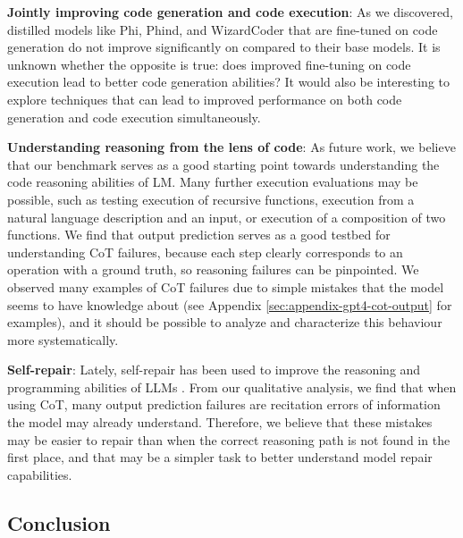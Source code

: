 \textbf{Jointly improving code generation and code execution}: As we discovered, distilled models like Phi, Phind, and WizardCoder that are fine-tuned on code generation do not improve significantly on \benchmark compared to their base models. It is unknown whether the opposite is true: does improved fine-tuning on code execution lead to better code generation abilities? It would also be interesting to explore techniques that can lead to improved performance on both code generation and code execution simultaneously.

\textbf{Understanding reasoning from the lens of code}: As future work, we believe that our benchmark serves as a good starting point towards understanding the code reasoning abilities of LM. Many further execution evaluations may be possible, such as testing execution of recursive functions, execution from a natural language description and an input, or execution of a composition of two functions. We find that output prediction serves as a good testbed for understanding CoT failures, because each step clearly corresponds to an operation with a ground truth, so reasoning failures can be pinpointed. We observed many examples of CoT failures due to simple mistakes that the model seems to have knowledge about (see Appendix \ref{sec:appendix-gpt4-cot-output} for examples), and it should be possible to analyze and characterize this behaviour more systematically. 

\textbf{Self-repair}: Lately, self-repair has been used to improve the reasoning and programming abilities of LLMs \citep{chen2023teaching, olausson2023demystifying, madaan2023self, peng2023check, zhang2023self, tyen2023llms}. From our qualitative analysis, we find that when using CoT, many output prediction failures are recitation errors of information the model may already understand. Therefore, we believe that these mistakes may be easier to repair than when the correct reasoning path is not found in the first place, and that \benchmark may be a simpler task to better understand model repair capabilities.

\subsection{Conclusion}

